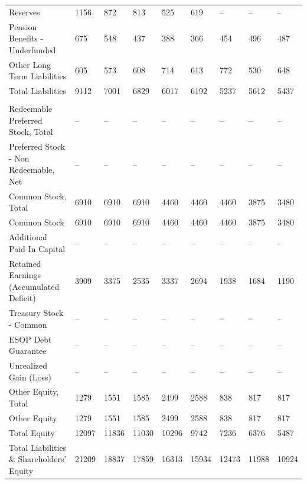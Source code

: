 \documentclass[grad,numbers]{coppe}
\begin{document}
\begin{longtable}[t]{lllllllll}
  \hspace{1em}\hspace{1em}Reserves & 1156 & 872 & 813 & 525 & 619 & -- & -- & --\\
  \hspace{1em}\hspace{1em}Pension Benefits - Underfunded & 675 & 548 & 437 & 388 & 366 & 454 & 496 & 487\\
  \hspace{1em}\hspace{1em}Other Long Term Liabilities & 605 & 573 & 608 & 714 & 613 & 772 & 530 & 648\\
  \hspace{1em}Total Liabilities & 9112 & 7001 & 6829 & 6017 & 6192 & 5237 & 5612 & 5437\\
  \addlinespace[0.3em]
  \multicolumn{9}{l}{\textbf{Shareholders' Equity}}\\
  \hspace{1em}Redeemable Preferred Stock, Total & -- & -- & -- & -- & -- & -- & -- & --\\
  \hspace{1em}Preferred Stock - Non Redeemable, Net & -- & -- & -- & -- & -- & -- & -- & --\\
  \hspace{1em}Common Stock, Total & 6910 & 6910 & 6910 & 4460 & 4460 & 4460 & 3875 & 3480\\
  \hspace{1em}\hspace{1em}Common Stock & 6910 & 6910 & 6910 & 4460 & 4460 & 4460 & 3875 & 3480\\
  \hspace{1em}Additional Paid-In Capital & -- & -- & -- & -- & -- & -- & -- & --\\
  \hspace{1em}Retained Earnings (Accumulated Deficit) & 3909 & 3375 & 2535 & 3337 & 2694 & 1938 & 1684 & 1190\\
  \hspace{1em}Treasury Stock - Common & -- & -- & -- & -- & -- & -- & -- & --\\
  \hspace{1em}ESOP Debt Guarantee & -- & -- & -- & -- & -- & -- & -- & --\\
  \hspace{1em}Unrealized Gain (Loss) & -- & -- & -- & -- & -- & -- & -- & --\\
  \hspace{1em}Other Equity, Total & 1279 & 1551 & 1585 & 2499 & 2588 & 838 & 817 & 817\\
  \hspace{1em}\hspace{1em}Other Equity & 1279 & 1551 & 1585 & 2499 & 2588 & 838 & 817 & 817\\
  \hspace{1em}Total Equity & 12097 & 11836 & 11030 & 10296 & 9742 & 7236 & 6376 & 5487\\
  \hspace{1em}Total Liabilities \& Shareholders' Equity & 21209 & 18837 & 17859 & 16313 & 15934 & 12473 & 11988 & 10924\\*
  \end{longtable}
\end{document}
